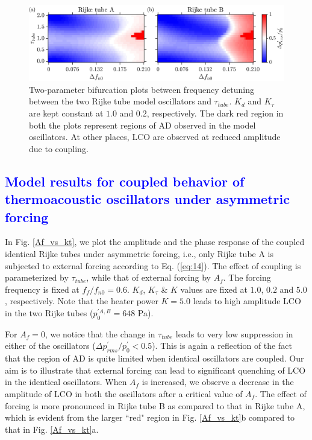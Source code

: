 \documentclass[%
preprint,
 amsmath,amssymb,
 aps,
 pra,
]{revtex4-2}
\begin{document}
\begin{figure}[t!]
\centering
\includegraphics[scale=0.16]{fig9.jpg}
\caption{\label{det_vs_tau}Two-parameter bifurcation plots between frequency detuning between the two Rijke tube model oscillators and $\tau_{tube}$. $K_d$ and $K_{\tau}$ are kept constant at $1.0$ and $0.2$, respectively. The dark red region in both the plots represent regions of AD observed in the model oscillators. At other places, LCO are observed at reduced amplitude due to coupling. }
\end{figure}

\textcolor{blue}{\subsection{Model results for coupled behavior of thermoacoustic oscillators under asymmetric forcing}}
\label{model_coupled_forced}

In Fig. \ref{Af_vs_kt}, we plot the amplitude and the phase response of the coupled identical Rijke tubes under asymmetric forcing, i.e., only Rijke tube A is subjected to external forcing according to Eq. (\ref{eq:14}). The effect of coupling is parameterized by $\tau_{tube}$, while that of external forcing by $A_f$. The forcing frequency is fixed at $f_f/f_{n0} = 0.6$. $K_d$, $K_{\tau}$ \& $K$ values are fixed at $1.0$, $0.2$ and $5.0$, respectively. Note that the heater power $K=5.0$ leads to high amplitude LCO in the two Rijke tubes ($p^{{\prime}{A,B}}_0 = 648$ Pa).

For $A_f = 0$, we notice that the change in $\tau_{tube}$ leads to very low suppression in either of the oscillators ($\Delta p^\prime_{rms}/p^\prime_{0}<0.5$). This is again a reflection of the fact that the region of AD is quite limited when identical oscillators are coupled. Our aim is to illustrate that external forcing can lead to significant quenching of LCO in the identical oscillators. When $A_f$ is increased, we observe a decrease in the amplitude of LCO in both the oscillators after a critical value of $A_f$. The effect of forcing is more pronounced in Rijke tube B as compared to that in Rijke tube A, which is evident from the larger ``red" region in Fig. \ref{Af_vs_kt}b compared to that in Fig. \ref{Af_vs_kt}a. %
\end{document}
